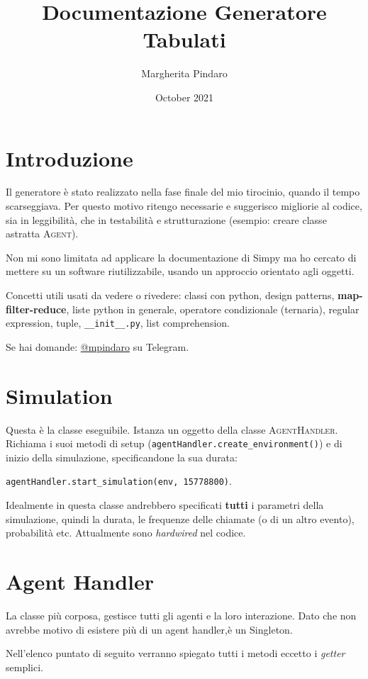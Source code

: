 \documentclass{article}
\title{Documentazione Generatore Tabulati}
\author{Margherita Pindaro }
\date{October 2021}
\begin{document}
\maketitle

\section{Introduzione}
Il generatore è stato realizzato nella fase finale del mio tirocinio, quando il tempo scarseggiava. Per questo motivo ritengo necessarie e suggerisco migliorie al codice, sia in leggibilità, che in testabilità e strutturazione (esempio: creare classe astratta \textsc{Agent}).

Non mi sono limitata ad applicare la documentazione di Simpy ma ho cercato di mettere su un software riutilizzabile, usando un approccio orientato agli oggetti. 

Concetti utili usati da vedere o rivedere: classi con python, design patterns, \textbf{map-filter-reduce}, liste python in generale, operatore condizionale (ternaria), regular expression, tuple, \texttt{__init__.py}, list comprehension.

Se hai domande: \href{https://t.me/mpindaro}{@mpindaro} su Telegram.

\section{Simulation}

Questa è la classe eseguibile. Istanza un oggetto della classe \textsc{AgentHandler}. Richiama i suoi metodi di setup (\texttt{agentHandler.create_environment()}) e di inizio della simulazione, specificandone la sua durata: 

\texttt{agentHandler.start_simulation(env, 15778800)}.

Idealmente in questa classe andrebbero specificati \textbf{tutti} i parametri della simulazione, quindi la durata, le frequenze delle chiamate (o di un altro evento), probabilità etc. Attualmente sono \textit{hardwired} nel codice.

\section{Agent Handler}
La classe più corposa, gestisce tutti gli agenti e la loro interazione. Dato che non avrebbe motivo di esistere più di un agent handler,è un Singleton.

Nell'elenco puntato di seguito verranno spiegato tutti i metodi eccetto i \textit{getter} semplici.
\end{document}
